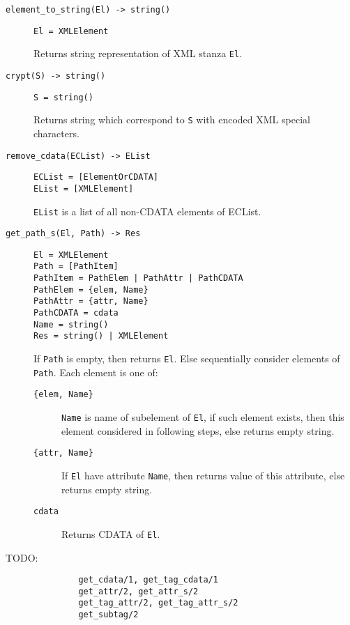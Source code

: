 \documentclass[10pt]{article}
\begin{document}
\begin{description}
\item[\verb|element_to_string(El) -> string()|]
\begin{verbatim}
El = XMLElement
\end{verbatim}
  Returns string representation of XML stanza \texttt{El}.

\item[\verb|crypt(S) -> string()|]
\begin{verbatim}
S = string()
\end{verbatim}
  Returns string which correspond to \texttt{S} with encoded XML special
  characters.

\item[\verb|remove_cdata(ECList) -> EList|]
\begin{verbatim}
ECList = [ElementOrCDATA]
EList = [XMLElement]
\end{verbatim}
  \texttt{EList} is a list of all non-CDATA elements of ECList.



\item[\verb|get_path_s(El, Path) -> Res|]
\begin{verbatim}
El = XMLElement
Path = [PathItem]
PathItem = PathElem | PathAttr | PathCDATA
PathElem = {elem, Name}
PathAttr = {attr, Name}
PathCDATA = cdata
Name = string()
Res = string() | XMLElement
\end{verbatim}
  If \texttt{Path} is empty, then returns \texttt{El}.  Else sequentially
  consider elements of \texttt{Path}.  Each element is one of:
  \begin{description}
  \item[\verb|{elem, Name}|] \texttt{Name} is name of subelement of
    \texttt{El}, if such element exists, then this element considered in
    following steps, else returns empty string.
  \item[\verb|{attr, Name}|] If \texttt{El} have attribute \texttt{Name}, then
    returns value of this attribute, else returns empty string.
  \item[\verb|cdata|] Returns CDATA of \texttt{El}.
  \end{description}

\item[TODO:]
\begin{verbatim}
         get_cdata/1, get_tag_cdata/1
         get_attr/2, get_attr_s/2
         get_tag_attr/2, get_tag_attr_s/2
         get_subtag/2
\end{verbatim}
\end{description}
\end{document}
